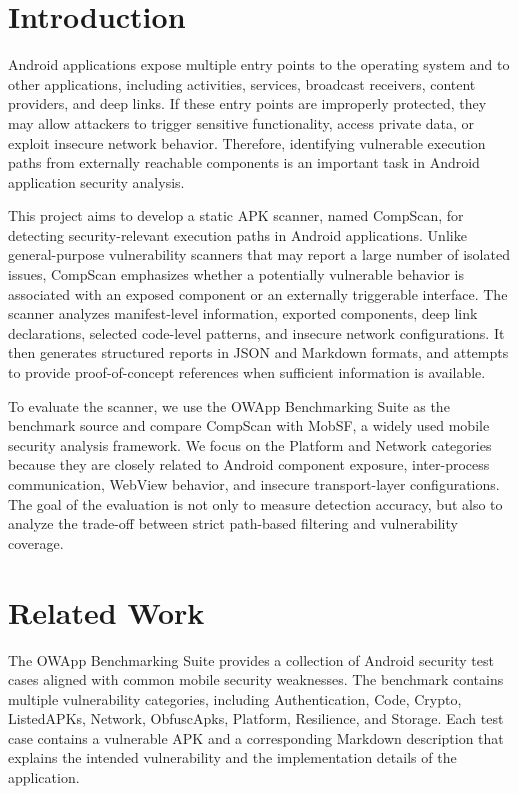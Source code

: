 \documentclass[sigconf, nonacm]{acmart}
\begin{document}
\section{Introduction}

Android applications expose multiple entry points to the operating system and to other applications, including activities, services, broadcast receivers, content providers, and deep links. If these entry points are improperly protected, they may allow attackers to trigger sensitive functionality, access private data, or exploit insecure network behavior. Therefore, identifying vulnerable execution paths from externally reachable components is an important task in Android application security analysis.

This project aims to develop a static APK scanner, named CompScan, for detecting security-relevant execution paths in Android applications. Unlike general-purpose vulnerability scanners that may report a large number of isolated issues, CompScan emphasizes whether a potentially vulnerable behavior is associated with an exposed component or an externally triggerable interface. The scanner analyzes manifest-level information, exported components, deep link declarations, selected code-level patterns, and insecure network configurations. It then generates structured reports in JSON and Markdown formats, and attempts to provide proof-of-concept references when sufficient information is available.

To evaluate the scanner, we use the OWApp Benchmarking Suite as the benchmark source and compare CompScan with MobSF, a widely used mobile security analysis framework. We focus on the Platform and Network categories because they are closely related to Android component exposure, inter-process communication, WebView behavior, and insecure transport-layer configurations. The goal of the evaluation is not only to measure detection accuracy, but also to analyze the trade-off between strict path-based filtering and vulnerability coverage.

\section{Related Work}

The OWApp Benchmarking Suite provides a collection of Android security test cases aligned with common mobile security weaknesses. The benchmark contains multiple vulnerability categories, including Authentication, Code, Crypto, ListedAPKs, Network, ObfuscApks, Platform, Resilience, and Storage. Each test case contains a vulnerable APK and a corresponding Markdown description that explains the intended vulnerability and the implementation details of the application.
\end{document}
